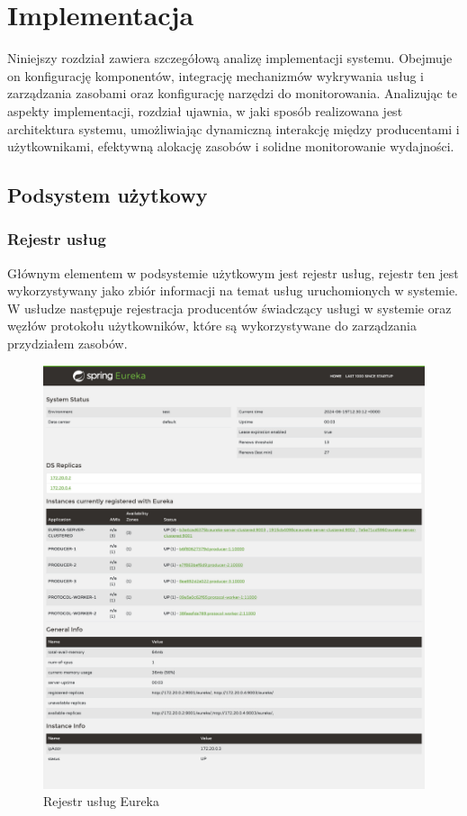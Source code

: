 \chapter{Implementacja}

Niniejszy rozdział zawiera szczegółową analizę implementacji systemu. Obejmuje on konfigurację komponentów, integrację mechanizmów wykrywania usług i zarządzania zasobami oraz konfigurację narzędzi do monitorowania. Analizując te aspekty implementacji, rozdział ujawnia, w jaki sposób realizowana jest architektura systemu, umożliwiając dynamiczną interakcję między producentami i użytkownikami, efektywną alokację zasobów i solidne monitorowanie wydajności.

\section{Podsystem użytkowy}
\subsection{Rejestr usług}

Głównym elementem w podsystemie użytkowym jest rejestr usług, rejestr ten jest wykorzystywany jako zbiór informacji na temat usług uruchomionych w systemie. W usłudze następuje rejestracja producentów świadczący usługi w systemie oraz węzłów protokołu użytkowników, które są wykorzystywane do zarządzania przydziałem zasobów.

\begin{figure}[!htbp]
    \centering
    \includegraphics[width=\textwidth]{images/implementation/ServerDiscovery3Producer2Workers.png}
    \caption{Rejestr usług Eureka}
    \label{eurekaServerItems}
\end{figure}

